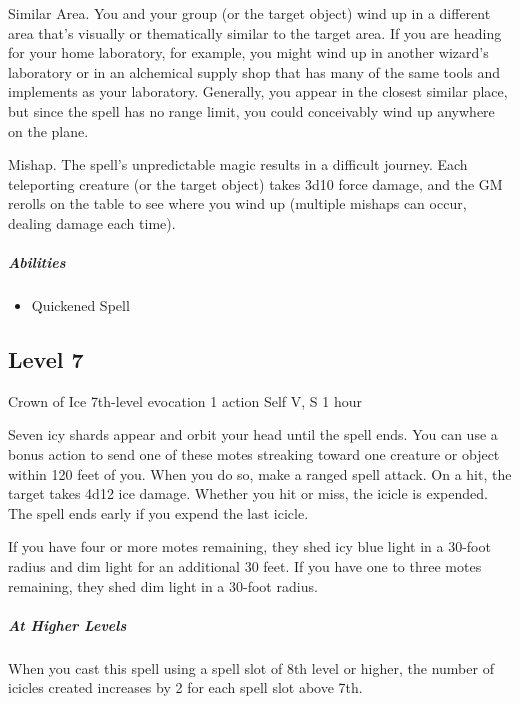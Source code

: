 \documentclass[a4paper,openany,twocolumn]{book}
\begin{document}
Similar Area. You and your group (or the target object) wind up in a different area that’s visually or thematically similar to the target area. If you are heading for your home laboratory, for example, you might wind up in another wizard’s laboratory or in an alchemical supply shop that has many of the same tools and implements as your laboratory. Generally, you appear in the closest similar place, but since the spell has no range limit, you could conceivably wind up anywhere on the plane.

Mishap. The spell’s unpredictable magic results in a difficult journey. Each teleporting creature (or the target object) takes 3d10 force damage, and the GM rerolls on the table to see where you wind up (multiple mishaps can occur, dealing damage each time).

\subparagraph*{Abilities}
\begin{itemize}
  \item Quickened Spell
\end{itemize}

\subsection*{Level 7}
\DndSpellHeader
  {Crown of Ice}
  {7th-level evocation}
  {1 action}
  {Self}
  {V, S}
  {1 hour}

Seven icy shards appear and orbit your head until the spell ends. You can use a bonus action to send one of these motes streaking toward one creature or object within 120 feet of you. When you do so, make a ranged spell attack. On a hit, the target takes 4d12 ice damage. Whether you hit or miss, the icicle is expended. The spell ends early if you expend the last icicle.

If you have four or more motes remaining, they shed icy blue light in a 30-foot radius and dim light for an additional 30 feet. If you have one to three motes remaining, they shed dim light in a 30-foot radius.

\subparagraph*{At Higher Levels} When you cast this spell using a spell slot of 8th level or higher, the number of icicles created increases by 2 for each spell slot above 7th.
\end{document}
